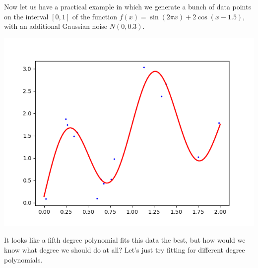 \documentclass{article}
\theoremstyle{definition}
\theoremstyle{remark}
\theoremstyle{definition}
\begin{document}
Now let us have a practical example in which we generate a bunch of data points on the interval $[0, 1]$ of the function $f(x) = \sin(2\pi x) + 2\cos (x - 1.5)$, with an additional Gaussian noise $N(0, 0.3)$. 
\begin{center}
    \includegraphics[scale=0.4]{polynomial_first/True_data.png}
\end{center}
It looks like a fifth degree polynomial fits this data the best, but how would we know what degree we should do at all? Let's just try fitting for different degree polynomials. 
\end{document}
